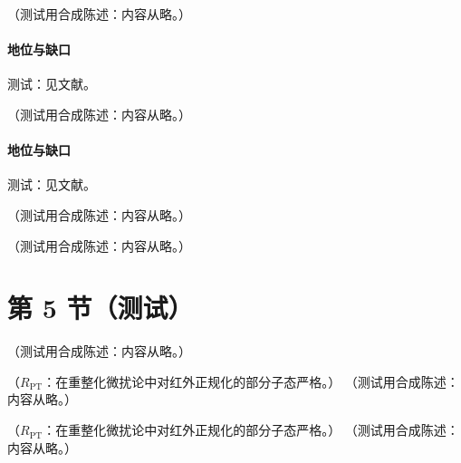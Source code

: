 \begin{proposition}\label{prop:front-flow-renorm}
（测试用合成陈述：内容从略。）
\end{proposition}
\paragraph{地位与缺口}测试：见文献。

\begin{conjecture}\label{conj:front-ope-convergence}
（测试用合成陈述：内容从略。）
\end{conjecture}
\paragraph{地位与缺口}测试：见文献。

\begin{remark}\label{rem:front-ope-qcd-status}
（测试用合成陈述：内容从略。）
\end{remark}

\begin{lemma}\label{lem:front-jantzen}
（测试用合成陈述：内容从略。）
\end{lemma}

\section{第 5 节（测试）}\label{sec:front-glauber}

\begin{definition}\label{def:front-facets}
（测试用合成陈述：内容从略。）
\end{definition}

\begin{proposition}\label{prop:front-lp-facets}
（$R_{\mathrm{PT}}$：在重整化微扰论中对红外正规化的部分子态严格。）
（测试用合成陈述：内容从略。）
\end{proposition}

\begin{proposition}[宽角 Green 函数在壳展开：区域 = Landau 解 = 面 \tagR]\label{prop:front-onshell-facets}
（$R_{\mathrm{PT}}$：在重整化微扰论中对红外正规化的部分子态严格。）
（测试用合成陈述：内容从略。）
\end{proposition}

